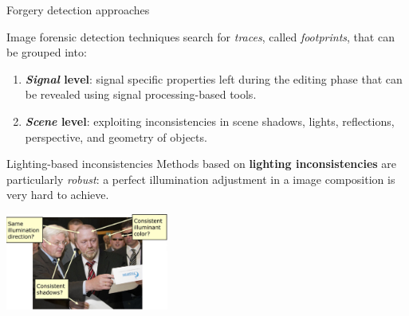 \begin{tframe}{Forgery detection approaches}

\vspace{0.2cm}
Image forensic detection techniques search for \textit{traces}, called \emph{footprints}, that can be grouped into:
\vspace{0.3cm}
\begin{enumerate}
\item<2-> \textbf{\textit{Signal} level}: signal specific properties left during the editing phase that can be revealed using signal processing-based tools.
\vspace{0.3cm}
\item<3-> \textbf{\textit{Scene} level}: exploiting inconsistencies in scene shadows, lights, reflections, perspective, and geometry of objects.
\end{enumerate}
\vspace{0.3cm}
\end{tframe}


\begin{tframe}{Lighting-based inconsistencies}
Methods based on \textbf{lighting inconsistencies} are particularly \emph{robust}: a perfect illumination adjustment in a image composition is very hard to achieve.
\begin{center}
\includegraphics[width=0.4\textwidth]{images/lighting-based.jpg}
\end{center}
\vspace{0.3cm}
\end{tframe}


